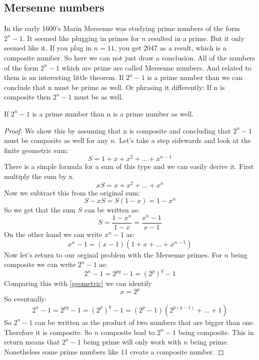\documentclass{article}
\theoremstyle{definition}
\begin{document}
\subsection{Mersenne numbers}
In the early 1600's Marin Mersenne was studying prime numbers of the form $2^n-1$. It seemed like plugging in primes for $n$ resulted in a prime. But it only seemed like it. If you plug in $n=11$, you get 2047 as a result, which is a composite number. So here we can not just draw a conclusion. All of the numbers of the form $2^n-1$ which are prime are called Mersenne numbers. And related to them is an interesting little theorem.
 If $2^n-1$ is a prime number than we can conclude that n must be prime as well.  Or phrasing it differently: If n is composite then $2^n-1$ must be as well.
\begin{theorem}
    If $2^n-1$ is a prime number than n is a prime number as well.
\end{theorem}
\begin{proof}
    We show this by assuming that n is composite and concluding that $2^n-1$ must be composite as well for any $n$.
    Let's take a step sidewards and look at the finite geometric sum:
    \begin{equation}
        S = 1 + x + x^2 + ... + x^{n-1}
    \end{equation}
    There is a simple formula for a sum of this type and we can easily derive it. First multiply the sum by x.
    \begin{equation}
        xS = x + x^2 + ... + x^n
    \end{equation}
    Now we subtract this from the original sum:
    \begin{equation}
        S - xS = S(1-x) = 1-x^n
    \end{equation}
    So we get that the sum $S$ can be written as:
    \begin{equation}
        S = \frac{1-x^n}{1-x} = \frac{x^n-1}{x-1}
    \end{equation}
    On the other hand we can write $x^n-1$ as:
    \begin{equation}\label{geometric}
        x^n - 1 = (x-1)(1+x+...+x^{n-1})
    \end{equation}
    Now let's return to our orginal problem with the Mersenne primes. For $n$ being composite we can write $2^n-1$ as:
    \begin{equation}
        2^n-1 = 2^{pq}-1 = (2^p)^q-1
    \end{equation}
    Comparing this with \ref{geometric} we can identify
    \begin{equation}
        x = 2^p
    \end{equation}
    So eventually:
    \begin{equation}
        2^n-1 = 2^{pq}-1 = (2^p)^q-1 = (2^p-1)(2^{p(q-1)} + ... + 1)
    \end{equation}
    So $2^n-1$ can be written as the product of two numbers that are bigger than one. Therefore it is composite. So $n$ composite lead to $2^n-1$ being composite. This in return means that $2^n-1$ being prime will only work with $n$ being prime. Nonetheless some prime numbers like 11 create a composite number.

    
\end{proof}
\end{document}
